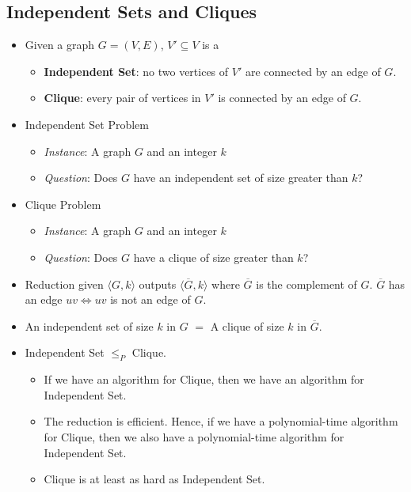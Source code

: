 \documentclass[12pt]{article}
\begin{document}
\subsection{Independent Sets and Cliques}
\begin{itemize}
    \item Given a graph $G = (V, E)$, $V' \subseteq V$ is a
    \begin{itemize}
        \item \textbf{Independent Set}: no two vertices of $V'$ are connected by an edge of $G$.
        \item \textbf{Clique}: every pair of vertices in $V'$ is connected by an edge of $G$.
    \end{itemize}
    \item Independent Set Problem
    \begin{itemize}
        \item \textit{Instance}: A graph $G$ and an integer $k$
        \item \textit{Question}: Does $G$ have an independent set of size greater than $k$?
    \end{itemize}
    \item Clique Problem
    \begin{itemize}
        \item \textit{Instance}: A graph $G$ and an integer $k$
        \item \textit{Question}: Does $G$ have a clique of size greater than $k$?
    \end{itemize}
    \item Reduction given $\langle G, k \rangle$ outputs $\langle \overline{G}, k \rangle$ where $\overline{G}$ is the complement of $G$. $\overline{G}$ has an edge $uv \iff uv$ is not an edge of $G$.
    \item An independent set of size $k$ in $G$ $=$ A clique of size $k$ in $\overline{G}$.
    \item Independent Set $\leq_P$ Clique.
    \begin{itemize}
        \item If we have an algorithm for Clique, then we have an algorithm for Independent Set.
        \item The reduction is efficient. Hence, if we have a polynomial-time algorithm for Clique, then we also have a polynomial-time algorithm for Independent Set.
        \item Clique is at least as hard as Independent Set.
    \end{itemize}

\end{itemize}
\end{document}

